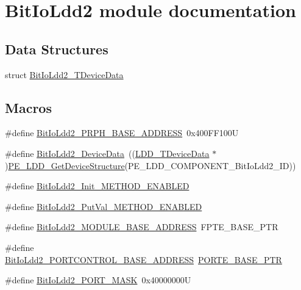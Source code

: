 \hypertarget{group___bit_io_ldd2__module}{}\section{Bit\+Io\+Ldd2 module documentation}
\label{group___bit_io_ldd2__module}
\subsection*{Data Structures}
\begin{DoxyCompactItemize}
\item 
struct \hyperlink{struct_bit_io_ldd2___t_device_data}{Bit\+Io\+Ldd2\+\_\+\+T\+Device\+Data}
\end{DoxyCompactItemize}
\subsection*{Macros}
\begin{DoxyCompactItemize}
\item 
\#define \hyperlink{group___bit_io_ldd2__module_gae2c93f84ea59b52ac4e0b1eac3a8b47f}{Bit\+Io\+Ldd2\+\_\+\+P\+R\+P\+H\+\_\+\+B\+A\+S\+E\+\_\+\+A\+D\+D\+R\+E\+SS}~0x400\+F\+F100U
\item 
\#define \hyperlink{group___bit_io_ldd2__module_gaf2ef02c6b9a8451493963d7ae23c7574}{Bit\+Io\+Ldd2\+\_\+\+Device\+Data}~((\hyperlink{group___p_e___types__module_gac5cf1362f1f0e3a2ce71b1bf2276d091}{L\+D\+D\+\_\+\+T\+Device\+Data} $\ast$)\hyperlink{group___p_e___types__module_gaa1c23d559daef5bcd3327ca83fb56f5a}{P\+E\+\_\+\+L\+D\+D\+\_\+\+Get\+Device\+Structure}(P\+E\+\_\+\+L\+D\+D\+\_\+\+C\+O\+M\+P\+O\+N\+E\+N\+T\+\_\+\+Bit\+Io\+Ldd2\+\_\+\+ID))
\item 
\#define \hyperlink{group___bit_io_ldd2__module_gaff3f9c9cb38ac7244b796333afef0c82}{Bit\+Io\+Ldd2\+\_\+\+Init\+\_\+\+M\+E\+T\+H\+O\+D\+\_\+\+E\+N\+A\+B\+L\+ED}
\item 
\#define \hyperlink{group___bit_io_ldd2__module_gaae37d2b18f37861246a3993a457b001c}{Bit\+Io\+Ldd2\+\_\+\+Put\+Val\+\_\+\+M\+E\+T\+H\+O\+D\+\_\+\+E\+N\+A\+B\+L\+ED}
\item 
\#define \hyperlink{group___bit_io_ldd2__module_gae34d8d80fda789aa770f3068a4c7dfc7}{Bit\+Io\+Ldd2\+\_\+\+M\+O\+D\+U\+L\+E\+\_\+\+B\+A\+S\+E\+\_\+\+A\+D\+D\+R\+E\+SS}~F\+P\+T\+E\+\_\+\+B\+A\+S\+E\+\_\+\+P\+TR
\item 
\#define \hyperlink{group___bit_io_ldd2__module_ga4194c86be52355349ef034fd3322dabf}{Bit\+Io\+Ldd2\+\_\+\+P\+O\+R\+T\+C\+O\+N\+T\+R\+O\+L\+\_\+\+B\+A\+S\+E\+\_\+\+A\+D\+D\+R\+E\+SS}~\hyperlink{group___p_o_r_t___peripheral_gab166fe285bbb15b52de610f408fe25d3}{P\+O\+R\+T\+E\+\_\+\+B\+A\+S\+E\+\_\+\+P\+TR}
\item 
\#define \hyperlink{group___bit_io_ldd2__module_gad48bd98192a32c10a7458ae8991abcb7}{Bit\+Io\+Ldd2\+\_\+\+P\+O\+R\+T\+\_\+\+M\+A\+SK}~0x40000000U
\end{DoxyCompactItemize}
